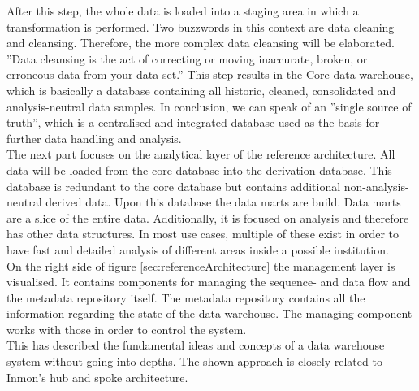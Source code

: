 After this step, the whole data is loaded into a staging area in which a transformation is performed. Two buzzwords in this context are data cleaning and cleansing. Therefore, the more complex data cleansing will be elaborated.
''Data cleansing is the act of correcting or moving inaccurate, broken, or erroneous data from your data-set.'' \cite{dataCleansing}
This step results in the Core data warehouse, which is basically a database containing all historic, cleaned, consolidated and analysis-neutral data samples. In conclusion, we can speak of an ''single source of truth''\cite{scriptRasch}, which is a centralised and integrated database used as the basis for further data handling and analysis.\newline
\\
The next part focuses on the analytical layer of the reference architecture. All data will be loaded from the core database into the derivation database. This database is redundant to the core database but contains additional non-analysis-neutral derived data. Upon this database the data marts are build. Data marts are a slice of the entire data. Additionally, it is focused on analysis and therefore has other data structures. In most use cases, multiple of these exist in order to have fast and detailed analysis of different areas inside a possible institution.\newline
\\
On the right side of figure \ref{sec:referenceArchitecture} the management layer is visualised. It contains components for managing the sequence- and data flow and the metadata repository itself. \newline
The metadata repository contains all the information regarding the state of the data warehouse. The managing component works with those in order to control the system.
\newline
\\
This has described the fundamental ideas and concepts of a data warehouse system without going into depths. The shown approach is closely related to Inmon's hub and spoke architecture. 
